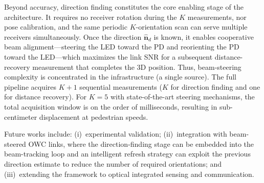 \documentclass[journal]{IEEEtran}
\newcommand{\added}[1]{{\color{blue}#1}}
\begin{document}
\added{Beyond accuracy, direction finding constitutes the core enabling stage of the architecture. It requires no receiver rotation during the $K$ measurements, nor pose calibration, and the same periodic $K$-orientation scan can serve multiple receivers simultaneously. Once the direction $\hat{\mathbf{n}}_d$ is known, it enables cooperative beam alignment---steering the LED toward the PD and reorienting the PD toward the LED---which maximizes the link SNR for a subsequent distance-recovery measurement that completes the 3D position. Thus, beam-steering complexity is concentrated in the infrastructure (a single source). The full pipeline acquires $K+1$ sequential measurements ($K$ for direction finding and one for distance recovery). For $K=5$ with state-of-the-art steering mechanisms, the total acquisition window is on the order of milliseconds, resulting in sub-centimeter displacement at pedestrian speeds.}

\added{Future works include: (i)~experimental validation; (ii)~integration with beam-steered OWC links, where the direction-finding stage can be embedded into the beam-tracking loop and an intelligent refresh strategy can exploit the previous direction estimate to reduce the number of required orientations; and (iii)~extending the framework to optical integrated sensing and communication.}


\appendices
\end{document}
